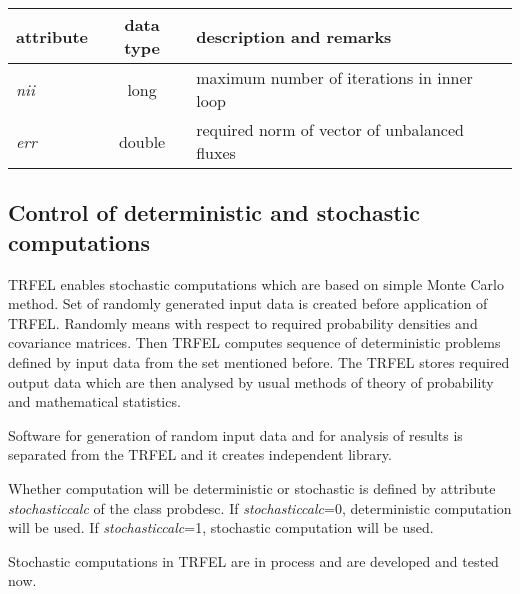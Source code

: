 \begin{center}
\begin{tabular}{|l|c|l|}
\hline
attribute & data type & description and remarks
\\ \hline \hline
{\it nii} & {\sf long} & maximum number of iterations in inner loop
\\ \hline
{\it err} & {\sf double} & required norm of vector of unbalanced fluxes
\\ \hline
\end{tabular}
\end{center}



\subsection{Control of deterministic and stochastic computations}
\label{sectdetstochcontr}

TRFEL enables stochastic computations which are based on simple Monte Carlo method.
Set of randomly generated input data is created before application of TRFEL. Randomly
means with respect to required probability densities and covariance matrices.
Then TRFEL computes sequence of deterministic problems defined by input data from
the set mentioned before. The TRFEL stores required output data which are then
analysed by usual methods of theory of probability and mathematical statistics.

Software for generation of random input data and for analysis of results is separated
from the TRFEL and it creates independent library.

Whether computation will be deterministic or stochastic is defined by attribute
{\it stochasticcalc} of the class {\sf probdesc}.
If {\it stochasticcalc}=0, deterministic
computation will be used.  If {\it stochasticcalc}=1, stochastic computation will be used.

Stochastic computations in TRFEL are in process and are developed and tested now.


